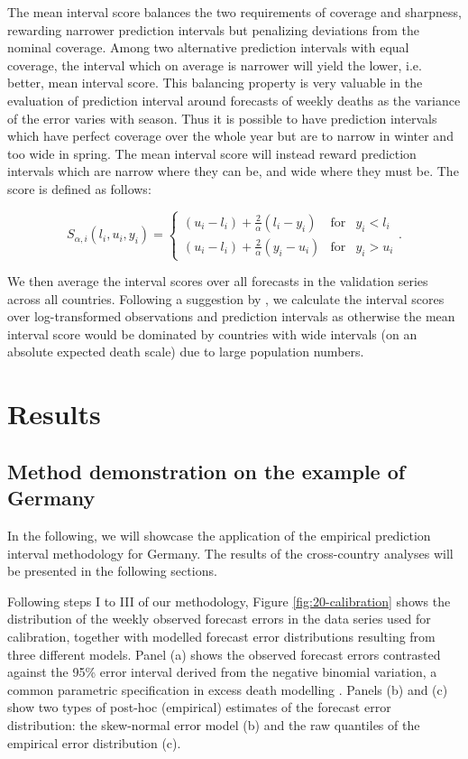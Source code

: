 \documentclass[12pt]{article}
\begin{document}
The mean interval score balances the two requirements of coverage and sharpness, rewarding narrower prediction intervals but penalizing deviations from the nominal coverage. Among two alternative prediction intervals with equal coverage, the interval which on average is narrower will yield the lower, i.e. better, mean interval score. This balancing property is very valuable in the evaluation of prediction interval around forecasts of weekly deaths as the variance of the error varies with season. Thus it is possible to have prediction intervals which have perfect coverage over the whole year but are to narrow in winter and too wide in spring. The mean interval score will instead reward prediction intervals which are narrow where they can be, and wide where they must be. The score is defined as follows:

\begin{equation}
    S_{\alpha,i}(l_i, u_i, y_i) = \left\{ \begin{array}{rcl}
   (u_i-l_i)+\frac{2}{\alpha}(l_i-y_i) & \mbox{for} & y_i<l_i \\
   (u_i-l_i)+\frac{2}{\alpha}(y_i-u_i) & \mbox{for} & y_i>u_i \end{array}. \right.
\end{equation}

We then average the interval scores over all forecasts in the validation series across all countries. Following a suggestion by \cite{bosse2023scoring}, we calculate the interval scores over log-transformed observations and prediction intervals as otherwise the mean interval score would be dominated by countries with wide intervals (on an absolute expected death scale) due to large population numbers.

\section*{Results}

\subsection*{Method demonstration on the example of Germany}

In the following, we will showcase the application of the empirical prediction interval methodology for Germany. The results of the cross-country analyses will be presented in the following sections.

Following steps I to III of our methodology, Figure \ref{fig:20-calibration} shows the distribution of the weekly observed forecast errors in the data series used for calibration, together with  modelled forecast error distributions resulting from three different models. Panel (a) shows the observed forecast errors contrasted against the 95\% error interval derived from the negative binomial variation, a common parametric specification in excess death modelling \cite{aburto2021estimating, msemburi2023estimates}. Panels (b) and (c) show two types of post-hoc (empirical) estimates of the forecast error distribution: the skew-normal error model (b) and the raw quantiles of the empirical error distribution (c).
\end{document}
